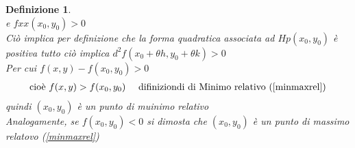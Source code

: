 \documentclass{book}
\newtheorem{defi}{Definizione}
\begin{document}
\begin{defi}
\begin{equation*}
         \end{equation*}
         e $fxx(x_0,y_0)>0$\\
         Ciò implica per definizione che la forma quadratica associata ad $Hp(x_0,y_0)$ è positiva
         tutto ciò implica $d^2f(x_0+\theta h, y_0+\theta k)>0$\\
         Per cui $f(x,y)-f(x_0,y_0)>0$ 
         \begin{equation*}
           \begin{matrix}
              \text{cioè } f(x,y)>f(x_0,y_0) & \text{ difiniziondi di Minimo relativo (\ref{minmaxrel})}
           \end{matrix}
         \end{equation*}
         quindi $(x_0,y_0)$ è un punto di muinimo relativo\\
         Analogamente, se $f(x_0,y_0)<0$ si dimosta che $(x_0,y_0)$ è un punto di massimo
         relatovo (\ref{minmaxrel})
\end{defi}
\clearpage
\end{document}
